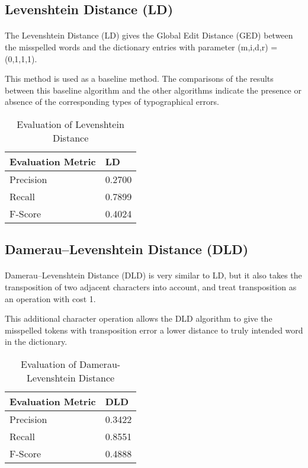 \documentclass[11pt]{article}
\begin{document}
\subsection{Levenshtein Distance (LD)}
\paragraph{} The Levenshtein Distance (LD) gives the Global Edit Distance (GED) between the misspelled words and the dictionary entries with parameter (m,i,d,r) = (0,1,1,1). 

This method is used as a baseline method. The comparisons of the results between this baseline algorithm and the other algorithms indicate the presence or absence of the corresponding types of typographical errors.

\begin{table}[h]
 \begin{center}
\begin{tabular}{| l | l |}

      \hline
      Evaluation Metric & LD \\
      \hline\hline
      Precision & 0.2700 \\
      Recall & 0.7899 \\
      F-Score & 0.4024 \\
      \hline

\end{tabular}
\caption{Evaluation of Levenshtein Distance}\label{table2}
 \end{center}
\end{table}


\subsection{Damerau–Levenshtein Distance (DLD)}

\paragraph{} Damerau–Levenshtein Distance (DLD) is very similar to LD, but it also takes the transposition of two adjacent characters into account, and treat transposition as an operation with cost 1.

This additional character operation allows the DLD algorithm to give the misspelled tokens with transposition error a lower distance to truly intended word in the dictionary.

\begin{table}[h]
 \begin{center}
\begin{tabular}{| l | l |}

      \hline
      Evaluation Metric & DLD \\
      \hline\hline
      Precision & 0.3422 \\
      Recall & 0.8551 \\
      F-Score & 0.4888 \\
      \hline

\end{tabular}
\caption{Evaluation of Damerau-Levenshtein Distance}\label{table3}
 \end{center}
\end{table}
\end{document}
